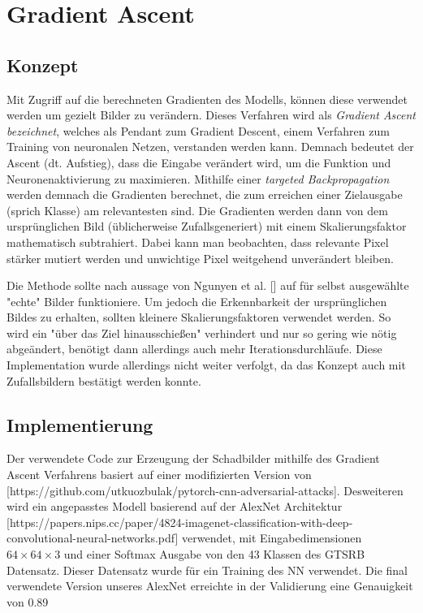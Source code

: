 \chapter{Gradient Ascent}
\label{cha:gascent}
\section{Konzept}

Mit Zugriff auf die berechneten Gradienten des Modells, können diese verwendet werden um gezielt Bilder zu verändern. Dieses Verfahren wird als \textit{Gradient Ascent bezeichnet}, welches als Pendant zum Gradient Descent, einem Verfahren zum Training von neuronalen Netzen, verstanden werden kann. Demnach bedeutet der Ascent (dt. Aufstieg), dass die Eingabe verändert wird, um die Funktion und Neuronenaktivierung zu maximieren. Mithilfe einer \textit{targeted Backpropagation} werden demnach die Gradienten berechnet, die zum erreichen einer Zielausgabe (sprich Klasse) am relevantesten sind. Die Gradienten werden dann von dem ursprünglichen Bild (üblicherweise Zufallsgeneriert) mit einem Skalierungsfaktor mathematisch subtrahiert. Dabei kann man beobachten, dass relevante Pixel stärker mutiert werden und unwichtige Pixel weitgehend unverändert bleiben.

Die Methode sollte nach aussage von Ngunyen et al. [] auf für selbst ausgewählte "echte" Bilder funktioniere. Um jedoch die Erkennbarkeit der ursprünglichen Bildes zu erhalten, sollten kleinere Skalierungsfaktoren verwendet werden. So wird ein "über das Ziel hinausschießen" verhindert und nur so gering wie nötig abgeändert, benötigt dann allerdings auch mehr Iterationsdurchläufe.
Diese Implementation wurde allerdings nicht weiter verfolgt, da das Konzept auch mit Zufallsbildern bestätigt werden konnte.

\section{Implementierung}
Der verwendete Code zur Erzeugung der Schadbilder mithilfe des Gradient Ascent Verfahrens basiert auf einer modifizierten Version von [https://github.com/utkuozbulak/pytorch-cnn-adversarial-attacks]. Desweiteren wird ein angepasstes Modell basierend auf der AlexNet Architektur [https://papers.nips.cc/paper/4824-imagenet-classification-with-deep-convolutional-neural-networks.pdf] verwendet, mit Eingabedimensionen $64\times64\times3$ und einer Softmax Ausgabe von den 43 Klassen des GTSRB Datensatz. 
Dieser Datensatz wurde für ein Training des NN verwendet. 
Die final verwendete Version unseres AlexNet erreichte in der Validierung eine Genauigkeit von 0.89


